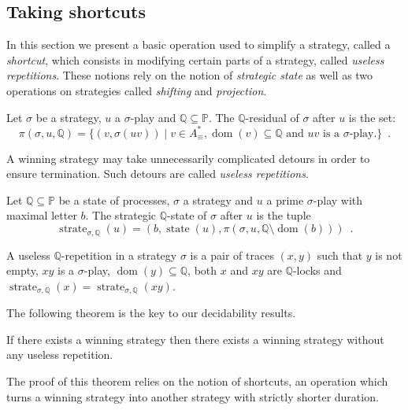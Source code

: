 \documentclass[a4paper,UKenglish]{lipics-v2016}
\newcommand{\PP}{\mathbb{P}}
\newcommand{\QQ}{\mathbb{Q}}
\DeclareMathOperator{\dom}{dom}
\DeclareMathOperator{\state}{state}
\DeclareMathOperator{\sstate}{strate}
\begin{document}
\subsection{Taking shortcuts}

In this section we present a basic operation
used to simplify a strategy, called a \emph{shortcut},
which consists in modifying certain parts of a strategy,
called \emph{useless repetitions}.
These notions rely on the notion of \emph{strategic state} as well as two operations on strategies called \emph{shifting} and \emph{projection}.

\begin{definition}[Residual]
Let $\sigma$ be a strategy,
$u$ a $\sigma$-play and $\QQ\subseteq \PP$.
The $\QQ$-residual of $\sigma$ after $u$ is
the set:
\[
\pi(\sigma,u,\QQ)
=
\{
(v,\sigma(uv))  \mid v \in A_\equiv^*, \dom(v) \subseteq \QQ \text{ and $uv$ is a $\sigma$-play.}
\}\enspace.
\]
\end{definition}

A winning strategy may take unnecessarily complicated detours in order to ensure termination.
Such detours are called \emph{useless repetitions}.
\begin{definition}
Let $\QQ\subseteq \PP$ be a state of processes,
$\sigma$ a strategy and $u$ a prime $\sigma$-play with maximal letter $b$.
The strategic $\QQ$-state of $\sigma$ after $u$ is the tuple
\[
\sstate_{\sigma,\QQ}(u)=
\left(b, \state(u),
\pi\left(\sigma,u, \QQ \setminus \dom(b)\right)
\right)
\enspace.
\]

\end{definition}






\begin{definition}
A useless $\QQ$-repetition in a strategy $\sigma$
is a pair of traces $(x,y)$ such that $y$ is not empty,
$xy$ is a $\sigma$-play,  $\dom(y)\subseteq \QQ$,
both $x$ and $xy$ are $\QQ$-locks and $\sstate_{\sigma,\QQ}(x)=\sstate_{\sigma,\QQ}(xy)$.
\end{definition}

The following theorem is the key to our decidability results.

\begin{theorem}
If there exists a winning strategy
then there exists a winning strategy 
without any useless repetition.
\label{theo:uselessdistrib}
\end{theorem}

The proof of this theorem relies on the notion of shortcuts,
an operation which turns a winning strategy into another strategy with strictly shorter duration.
\end{document}
